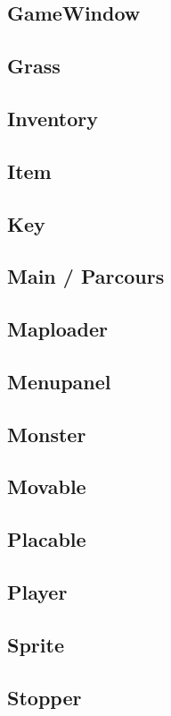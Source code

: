 \documentclass[a4paper,10pt,twoside]{article}
\begin{document}
\subsection{GameWindow}

\subsection{Grass}

\subsection{Inventory}

\subsection{Item}

\subsection{Key}

\subsection{Main / Parcours}

\subsection{Maploader}

\subsection{Menupanel}

\subsection{Monster}

\subsection{Movable}

\subsection{Placable}

\subsection{Player}

\subsection{Sprite}

\subsection{Stopper}

\end{document}
